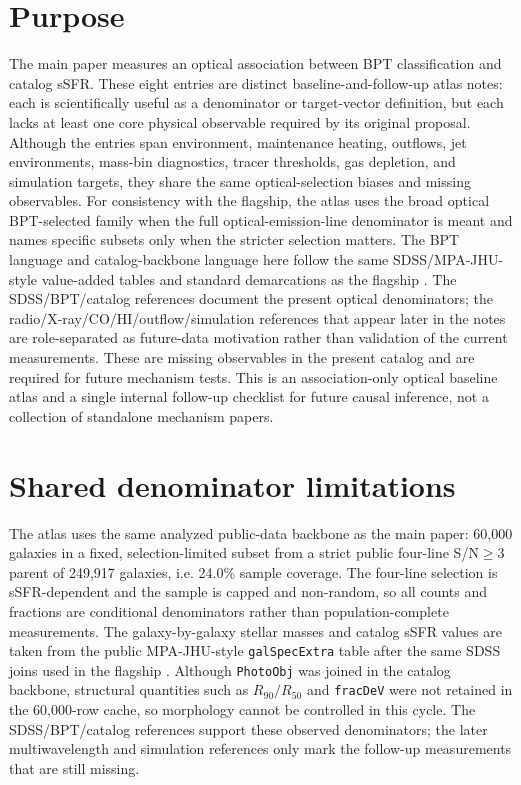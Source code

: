 \documentclass[twocolumn]{aastex631}
\begin{document}

\section{Purpose}
The main paper measures an optical association between BPT classification and catalog sSFR. These eight entries are distinct baseline-and-follow-up atlas notes: each is scientifically useful as a denominator or target-vector definition, but each lacks at least one core physical observable required by its original proposal. Although the entries span environment, maintenance heating, outflows, jet environments, mass-bin diagnostics, tracer thresholds, gas depletion, and simulation targets, they share the same optical-selection biases and missing observables. For consistency with the flagship, the atlas uses the broad optical BPT-selected family when the full optical-emission-line denominator is meant and names specific subsets only when the stricter selection matters. The BPT language and catalog-backbone language here follow the same SDSS/MPA-JHU-style value-added tables and standard demarcations as the flagship \citep{sdssdr17,brinchmann2004,york2000,baldwin1981,kewley2001,kauffmann2003bpt,kewley2006,stasinska2008,stasinska2015}. The SDSS/BPT/catalog references document the present optical denominators; the radio/X-ray/CO/HI/outflow/simulation references that appear later in the notes are role-separated as future-data motivation rather than validation of the current measurements. These are missing observables in the present catalog and are required for future mechanism tests. This is an association-only optical baseline atlas and a single internal follow-up checklist for future causal inference, not a collection of standalone mechanism papers.

\section{Shared denominator limitations}
The atlas uses the same analyzed public-data backbone as the main paper: 60,000 galaxies in a fixed, selection-limited subset from a strict public four-line S/N$\geq3$ parent of 249,917 galaxies, i.e. 24.0\% sample coverage. The four-line selection is sSFR-dependent and the sample is capped and non-random, so all counts and fractions are conditional denominators rather than population-complete measurements. The galaxy-by-galaxy stellar masses and catalog sSFR values are taken from the public MPA-JHU-style \texttt{galSpecExtra} table after the same SDSS joins used in the flagship \citep{sdssdr17,brinchmann2004,york2000}. Although \texttt{PhotoObj} was joined in the catalog backbone, structural quantities such as \(R_{90}/R_{50}\) and \texttt{fracDeV} were not retained in the 60,000-row cache, so morphology cannot be controlled in this cycle. The SDSS/BPT/catalog references support these observed denominators; the later multiwavelength and simulation references only mark the follow-up measurements that are still missing.
\end{document}
